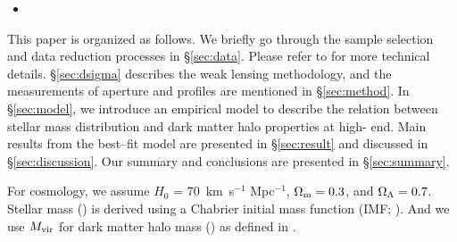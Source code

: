 \documentclass[a4paper,fleqn,usenatbib]{mnras}
\begin{document}
\begin{itemize}
        \item {}
    	
    \end{itemize}

    

    This paper is organized as follows. 
    We briefly go through the sample selection and data reduction processes in 
    \S \ref{sec:data}.  
    Please refer to  for more technical details.
    \S \ref{sec:dsigma} describes the weak lensing methodology, and the 
    measurements of aperture \mstar{} and \mden{} profiles are mentioned in 
    \S \ref{sec:method}.
    In \S \ref{sec:model}, we introduce an empirical model to describe the relation
    between stellar mass distribution and dark matter halo properties at 
    high-\mstar{} end. 
    Main results from the best--fit model are presented in \S \ref{sec:result} and 
    discussed in \S \ref{sec:discussion}. 
    Our summary and conclusions are presented in \S \ref{sec:summary}.

    
    For cosmology, we assume $H_0$ = 70~km~s$^{-1}$ Mpc$^{-1}$, 
    ${\Omega}_{\rm m}=0.3$, and ${\Omega}_{\rm \Lambda}=0.7$.
    Stellar mass (\mstar{}) is derived using a Chabrier initial mass function 
    (IMF; \citealt{Chabrier2003}). 
    And we use $M_{\rm vir}$ for dark matter halo mass (\mhalo{}) as 
    defined in \citealt{BryanNorman1998}.
    
\end{document}
